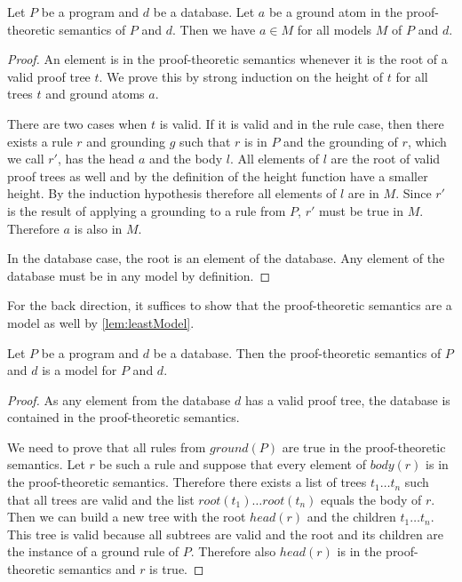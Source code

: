 \begin{lemma}[\proofTreeAtomsInEveryModel]
    Let $P$ be a program and $d$ be a database. Let $a$ be a ground atom in the proof-theoretic semantics of $P$ and $d$. Then we have $a \in M$ for all models $M$ of $P$ and $d$.
\end{lemma}
\begin{proof}
    An element is in the proof-theoretic semantics whenever it is the root of a valid proof tree $t$. We prove this by strong induction on the height of $t$ for all trees $t$ and ground atoms $a$.

    There are two cases when $t$ is valid. If it is valid and in the rule case, then there exists a rule $r$ and grounding $g$ such that $r$ is in $P$ and the grounding of $r$, which we call $r'$, has the head $a$ and the body $l$. All elements of $l$ are the root of valid proof trees as well and by the definition of the height function have a smaller height. By the induction hypothesis therefore all elements of $l$ are in $M$. Since $r'$ is the result of applying a grounding to a rule from $P$, $r'$ must be true in $M$. Therefore $a$ is also in $M$.

    In the database case, the root is an element of the database. Any element of the database must be in any model by definition. 
\end{proof}

For the back direction, it suffices to show that the proof-theoretic semantics are a model as well by \cref{lem:leastModel}.

\begin{lemma}[\proofTheoreticSemanticsIsModel]\label{lem:PTSModel}
    Let $P$ be a program and $d$ be a database. Then the proof-theoretic semantics of $P$ and $d$ is a model for $P$ and $d$.
\end{lemma}
\begin{proof}
    As any element from the database $d$ has a valid proof tree, the database is contained in the proof-theoretic semantics. 

    We need to prove that all rules from $ground(P)$ are true in the proof-theoretic semantics. Let $r$ be such a rule and suppose that every element of $body(r)$ is in the proof-theoretic semantics. Therefore there exists a list of trees $t_1 \dots t_n$ such that all trees are valid and the list $root(t_1) \dots root(t_n)$ equals the body of $r$. Then we can build a new tree with the root $head(r)$ and the children $t_1 \dots t_n$. This tree is valid because all subtrees are valid and the root and its children are the instance of a ground rule of $P$. Therefore also $head(r)$ is in the proof-theoretic semantics and $r$ is true.
\end{proof}

